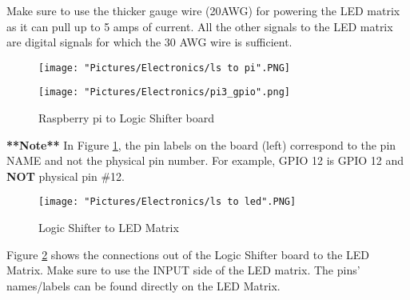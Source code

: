 \documentclass[12pt]{article}
\begin{document}
\noindent Make sure to use the thicker gauge wire (20AWG) for powering the LED matrix as it can pull up to 5 amps of current. All the other signals to the LED matrix are digital signals for which the 30 AWG wire is sufficient. 

\begin{figure}[H]
 	\centering
  	\begin{minipage}[b]{0.45\textwidth}
		\texttt{[image: "Pictures/Electronics/ls to pi".PNG]}
  	\end{minipage}
  	\hfill
  	\begin{minipage}[b]{0.45\textwidth}
    		\texttt{[image: "Pictures/Electronics/pi3\_gpio".png]}
  	\end{minipage}
	\caption{Raspberry pi to Logic Shifter board}
	\label{ls2pi}
\end{figure}

\textbf{**Note**} In Figure \ref{ls2pi}, the pin labels on the board (left) correspond to the pin NAME and not the physical pin number. For example, GPIO 12 is GPIO 12 and \textbf{NOT} physical pin \#12.

\begin{figure}[H]
 	\centering
	\texttt{[image: "Pictures/Electronics/ls to led".PNG]}
 	\caption{Logic Shifter to LED Matrix}
	\label{ls2led}
\end{figure}

Figure \ref{ls2led} shows the connections out of the Logic Shifter board to the LED Matrix. Make sure to use the INPUT side of the LED matrix. The pins' names/labels can be found directly on the LED Matrix.  
\end{document}
